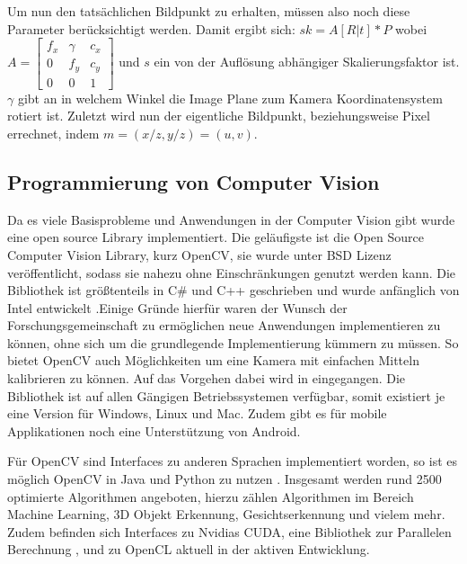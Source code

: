 Um nun den tatsächlichen Bildpunkt zu erhalten, müssen also noch diese Parameter berücksichtigt werden. Damit ergibt sich:
$sk = A [R | t] * P 
$
wobei $A = \begin{bmatrix} f_x & \gamma & c_x \\
                             0 &  f_y   & c_y \\
                             0 &  0     &  1\end{bmatrix}$ und $s$ ein von der Auflösung abhängiger Skalierungsfaktor ist. $\gamma$ gibt an in welchem Winkel die Image Plane zum Kamera Koordinatensystem rotiert ist. Zuletzt wird nun der eigentliche Bildpunkt, beziehungsweise Pixel errechnet, indem $m=(x/z, y/z)=(u,v)$.



\subsection{Programmierung von Computer Vision}
\label{sec:opencv}
Da es viele Basisprobleme und Anwendungen in der Computer Vision gibt wurde eine open source Library implementiert. Die geläufigste ist die Open Source Computer Vision Library, kurz OpenCV, sie wurde unter BSD Lizenz veröffentlicht, sodass sie nahezu ohne Einschränkungen genutzt werden kann. Die Bibliothek ist größtenteils in C\# und C++  geschrieben und wurde anfänglich von Intel entwickelt \textbf{\autocite[512--]{Medioni:2004:ETC:993884} }.Einige Gründe hierfür waren der Wunsch der Forschungsgemeinschaft zu ermöglichen neue Anwendungen implementieren zu können, ohne sich um die grundlegende Implementierung kümmern zu müssen. So bietet OpenCV auch Möglichkeiten um eine Kamera mit einfachen Mitteln kalibrieren zu können. Auf das Vorgehen dabei wird in  eingegangen.
Die Bibliothek ist auf allen Gängigen Betriebssystemen verfügbar, somit existiert je eine Version für Windows, Linux und Mac. Zudem gibt es für mobile Applikationen noch eine Unterstützung von Android.

Für OpenCV sind Interfaces zu anderen Sprachen implementiert worden, so ist es möglich OpenCV in Java und Python zu nutzen \autocite{OpenCV2016}. Insgesamt werden rund 2500 optimierte Algorithmen angeboten, hierzu zählen Algorithmen im Bereich Machine Learning, 3D Objekt Erkennung, Gesichtserkennung und vielem mehr. Zudem befinden sich Interfaces zu Nvidias CUDA, eine Bibliothek zur Parallelen Berechnung \autocite{cuda2017}, und zu OpenCL aktuell in der aktiven Entwicklung.




